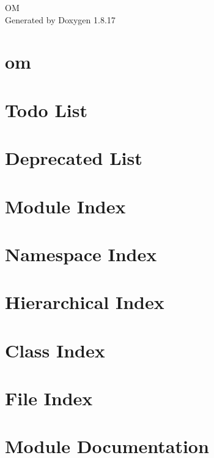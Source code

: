 \let\mypdfximage\pdfximage\def\pdfximage{\immediate\mypdfximage}\documentclass[twoside]{book}
\newcommand{\+}{\discretionary{\mbox{\scriptsize$\hookleftarrow$}}{}{}}
\newcommand{\clearemptydoublepage}{%
  \newpage{\pagestyle{empty}\cleardoublepage}%
}
\begin{document}
\hypersetup{pageanchor=false,
             bookmarksnumbered=true,
             pdfencoding=unicode
            }
\begin{titlepage}
\vspace*{7cm}
\begin{center}%
{\Large OM }\\
\vspace*{1cm}
{\large Generated by Doxygen 1.8.17}\\
\end{center}
\end{titlepage}
\clearemptydoublepage
{}
\tableofcontents
\clearemptydoublepage
{}
\hypersetup{pageanchor=true}

\chapter{om}
\label{md_README}

\chapter{Todo List}
\label{todo}

\chapter{Deprecated List}
\label{deprecated}

\chapter{Module Index}

\chapter{Namespace Index}

\chapter{Hierarchical Index}

\chapter{Class Index}

\chapter{File Index}

\chapter{Module Documentation}

\end{document}
